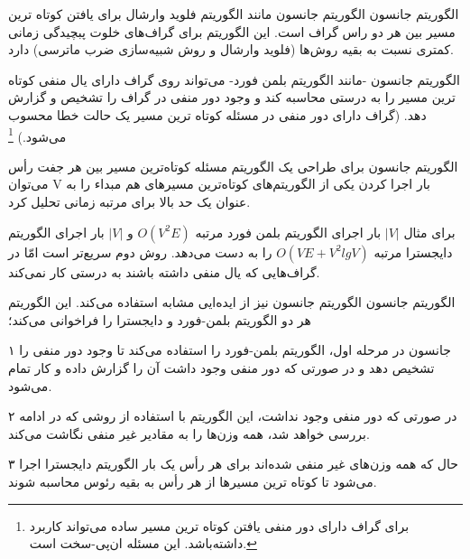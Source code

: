 
\begin{itemframe}{الگوریتم جانسون}
\itm
الگوریتم جانسون
مانند الگوریتم فلوید وارشال برای یافتن کوتاه ترین مسیر بین هر دو راس گراف است. این الگوریتم برای گراف‌های خلوت پبچیدگی زمانی کمتری نسبت به بقیه روش‌ها (فلوید وارشال و روش شبیه‌سازی ضرب ماترسی) دارد.

\itm
الگوریتم جانسون -مانند الگوریتم بلمن فورد- می‌تواند روی گراف دارای یال منفی کوتاه ترین مسیر را به درستی محاسبه کند و وجود دور منفی در گراف را تشخیص و گزارش دهد. (گراف دارای دور منفی در مسئله کوتاه ترین مسیر یک حالت خطا محسوب می‌شود.)
\footnote{برای گراف دارای دور منفی یافتن کوتاه ترین مسیر ساده می‌تواند کاربرد داشته‌باشد. این مسئله ان‌پی-سخت است.}
\end{itemframe}


\begin{itemframe}{الگوریتم جانسون}
\itm
برای طراحی یک الگوریتم مسئله کوتاه‌ترین مسیر بین هر جفت رأس می‌توان V بار اجرا کردن یکی از الگوریتم‌های کوتاه‌ترین مسیرهای هم مبداء را به عنوان یک حد بالا برای مرتبه زمانی تحلیل کرد.

\itm
برای مثال
$|V|$
بار اجرای الگوریتم بلمن فورد مرتبه
$O(V^2E)$
و
$|V|$
بار اجرای الگوریتم دایجسترا مرتبه
$O(VE+V^2lgV)$
را به دست می‌دهد.
\itm
روش دوم سریع‌تر است امّا در گراف‌‌هایی که یال منفی داشته باشند به درستی کار نمی‌کند.
\end{itemframe}


\begin{itemframe}{الگوریتم جانسون}
\itm
الگوریتم جانسون نیز از ایده‌ایی مشابه استفاده می‌کند. این الگوریتم هر دو الگوریتم بلمن-فورد و دایجسترا را فراخوانی می‌کند؛
\item[۱]
جانسون در مرحله اول، الگوریتم بلمن-فورد را استفاده می‌کند تا وجود دور منفی را تشخیص دهد و در صورتی که دور منفی وجود داشت آن را گزارش داده و کار تمام می‌شود.
\item[۲]
در صورتی که دور منفی وجود نداشت، این الگوریتم با استفاده از روشی که در ادامه بررسی خواهد شد، همه وزن‌ها را به مقادیر غیر منفی نگاشت می‌کند.
\item[۳]
حال که همه وزن‌‌های غیر منفی شده‌اند برای هر رأس یک بار الگوریتم دایجسترا اجرا می‌شود تا کوتاه ترین مسیرها از هر رأس به بقیه رئوس محاسبه شوند.
\end{itemframe}


